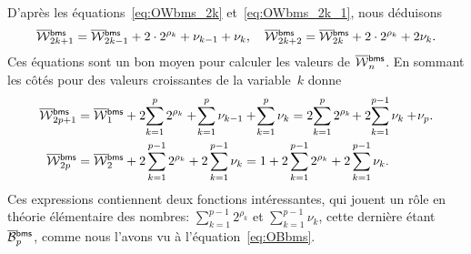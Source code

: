 D'après les équations~\eqref{eq:OWbms_2k} et~\eqref{eq:OWbms_2k_1},
nous déduisons
\begin{equation*}
\OW{\fun{bms}}{2k+1} = \OW{\fun{bms}}{2k-1} + 2 \cdot 2^{\rho_k} +
\nu_{k-1} + \nu_k,\quad \OW{\fun{bms}}{2k+2} = \OW{\fun{bms}}{2k} + 2
\cdot 2^{\rho_k} + 2\nu_k.
\end{equation*}
Ces équations sont un bon moyen pour calculer les valeurs de
\(\OW{\fun{bms}}{n}\). En sommant les côtés pour des valeurs
croissantes de la variable~\(k\) donne
\begin{align}
\OW{\fun{bms}}{2p+1}
 &= \OW{\fun{bms}}{1} + 2\!\sum_{k=1}^{p} 2^{\rho_k} +
    \!\sum_{k=1}^{p}\nu_{k-1} + \!\sum_{k=1}^p\nu_k
  = 2 \!\sum_{k=1}^{p} 2^{\rho_k}\! + 2\!\sum_{k=1}^{p-1}\nu_k +
    \!\nu_p.\label{eq:OWbms_2p_1}\\
\OW{\fun{bms}}{2p}
  &= \OW{\fun{bms}}{2} + 2\sum_{k=1}^{p-1}2^{\rho_k} +
2\sum_{k=1}^{p-1}\nu_k
  = 1 +  2\sum_{k=1}^{p-1}2^{\rho_k} + 2\sum_{k=1}^{p-1}\nu_k.
\label{eq:OWbms_2p}
\end{align}
Ces expressions contiennent deux fonctions intéressantes, qui jouent
un rôle en théorie élémentaire des nombres:
\(\sum_{k=1}^{p-1}2^{\rho_k}\) et \(\sum_{k=1}^{p-1}\nu_k\), cette
dernière étant \(\OB{\fun{bms}}{p}\), comme nous l'avons vu à
l'équation~\eqref{eq:OBbms}.  



